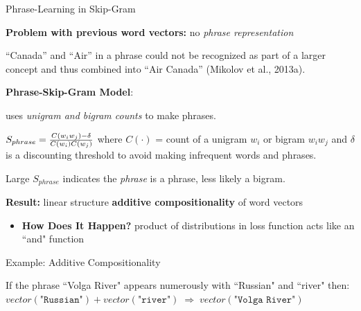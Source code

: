 \begin{frame}{Phrase-Learning in Skip-Gram}

    \begin{itemizeSpaced}{7pt}
    
        \pinkbox \textbf{Problem with previous word vectors:} no \emph{phrase representation}
        \begin{itemize}
            \arrowitem “Canada” and “Air” in a phrase could not be recognized as part of a larger concept and thus combined into “Air Canada” (Mikolov et al., 2013a).
        \end{itemize}
        
        \pinkbox \textbf{Phrase-Skip-Gram Model}:
        \begin{itemizeSpaced}{2pt}
            \pinkbox uses \emph{unigram and bigram counts} to make phrases.
            
            \item ${\large S_{phrase} = \frac{C(w_i w_j) - \delta} {C(w_i)C(w_j)} }$ where $C(\cdot)$ = count of a unigram $w_i$ or bigram $w_i w_j$ and $\delta$ is a discounting threshold to avoid making infrequent words and phrases.
            
            \item Large $S_{phrase}$ indicates the \emph{phrase} is a phrase, less likely a bigram. 
        \end{itemizeSpaced}
        
        
        \item \textbf{Result: } linear structure \textbf{additive compositionality} of word vectors 
        
        \begin{itemize}
            \pinkbox \textbf{Additive Compositionality: }lets some individual words be combined into a phrase and be viewed as a unique \emph{entity}, while a bigram like “this is” should remain unchanged (Mikolov et al., 2013a, p. 5).
            
            \item \textbf{How Does It Happen? } product of distributions in loss function acts like an ``and" function
        \end{itemize} 
        
        \begin{exampleBlock}{Example: Additive Compositionality}
        
        If the phrase ``Volga River" appears numerously with ``Russian" and ``river" then: $vector(\texttt{"Russian"}) \! + \! vector(\texttt{"river"}) \; \Rightarrow \; vector(\texttt{"Volga River"})$
        
        \end{exampleBlock}
        
        
    \end{itemizeSpaced}
    
\end{frame}